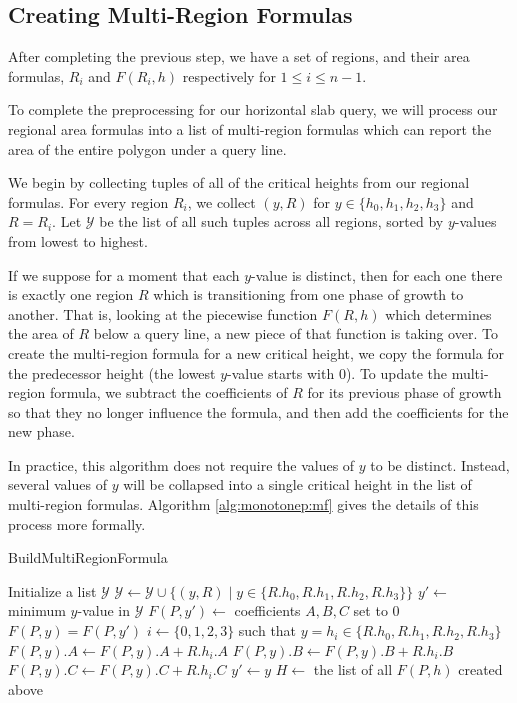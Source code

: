 \subsection{Creating Multi-Region Formulas}
\label{sec:mr_formula}

After completing the previous step, we have a set of regions, and their area formulas, $R_i$ and $F(R_i, h)$ respectively for $1 \leq i \leq n-1$.

To complete the preprocessing for our horizontal slab query, we will process our regional area formulas into a list of multi-region formulas which can report the area of the entire polygon under a query line.

We begin by collecting tuples of all of the critical heights from our regional formulas. 
For every region $R_i$, we collect $(y, R)$ for $y \in \{h_0, h_1, h_2, h_3\}$ and $R = R_i$.
Let $\mathcal{Y}$ be the list of all such tuples across all regions, sorted by $y$-values from lowest to highest.

If we suppose for a moment that each $y$-value is distinct, then for each one there is exactly one region $R$ which is transitioning from one phase of growth to another.
That is, looking at the piecewise function $F(R, h)$ which determines the area of $R$ below a query line, a new piece of that function is taking over.
To create the multi-region formula for a new critical height, we copy the formula for the predecessor height (the lowest $y$-value starts with 0).
To update the multi-region formula, we subtract the coefficients of $R$ for its previous phase of growth so that they no longer influence the formula, and then add the coefficients for the new phase.

In practice, this algorithm does not require the values of $y$ to be distinct. Instead, several values of $y$ will be collapsed into a single critical height in the list of multi-region formulas. Algorithm \ref{alg:monotonep:mf} gives the details of this process more formally.

\begin{algorithm}
\LinesNumbered
\DontPrintSemicolon
\caption{BuildMultiRegionFormula}
\label{alg:monotonep:mf}
\BlankLine
Initialize a list $\mathcal{Y}$\;
{
$\mathcal{Y} \gets \mathcal{Y} \cup \{ (y,R) \;|\; y \in \{R.h_0, R.h_1, R.h_2, R.h_3\}\}$\;
}
\;
\BlankLine
$y' \gets $ minimum $y$-value in $\mathcal{Y}$\;
$F(P, y') \gets $ coefficients $A,B,C$ set to 0\;
\BlankLine
{}
{
$F(P, y) = F(P, y')$\;
$i \gets \{0,1,2,3\}$ such that $y = h_i \in \{R.h_0, R.h_1, R.h_2, R.h_3\}$\;
$F(P,y).A \gets F(P,y).A + R.h_i.A$\;
$F(P,y).B \gets F(P,y).B + R.h_i.B$\;
$F(P,y).C \gets F(P,y).C + R.h_i.C$\;
\BlankLine
$y' \gets y$\;
}
\BlankLine
$H \gets $ the list of all $F(P, h)$ created above\;
\end{algorithm}

